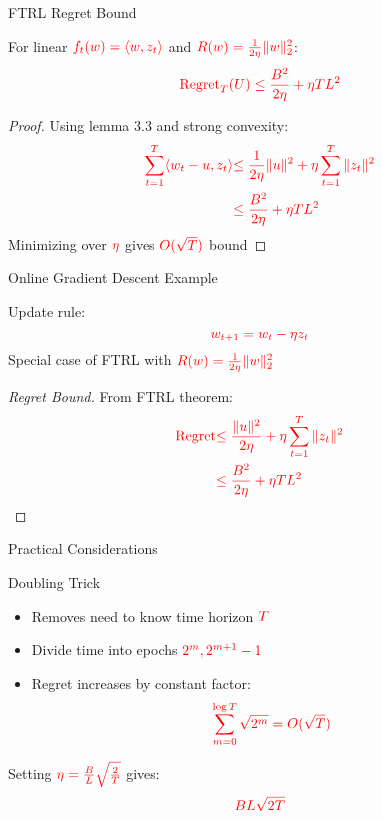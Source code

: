 \documentclass{beamer}
\begin{document}
\begin{frame}{FTRL Regret Bound}
\begin{theorem}[Theorem 2.4]
For linear $\textcolor{red}{f_t(w) = \langle w,z_t\rangle}$ and $\textcolor{red}{R(w) = \frac{1}{2\eta}\|w\|_2^2}$:
\[
\textcolor{red}{\text{Regret}_T(U) \leq \frac{B^2}{2\eta} + \eta T L^2}
\]
\end{theorem}

\begin{proof}
Using lemma 3.3 and strong convexity:
\begin{align*}
\textcolor{red}{\sum_{t=1}^T \langle w_t - u, z_t \rangle} &\textcolor{red}{\leq \frac{1}{2\eta}\|u\|^2 + \eta \sum_{t=1}^T \|z_t\|^2} \\
&\textcolor{red}{\leq \frac{B^2}{2\eta} + \eta T L^2}
\end{align*}
Minimizing over $\textcolor{red}{\eta}$ gives $\textcolor{red}{O(\sqrt{T})}$ bound
\end{proof}
\end{frame}

\begin{frame}{Online Gradient Descent Example}
\begin{example}
Update rule:
\[
\textcolor{red}{w_{t+1} = w_t - \eta z_t}
\]
Special case of FTRL with $\textcolor{red}{R(w) = \frac{1}{2\eta}\|w\|_2^2}$
\end{example}

\begin{proof}[Regret Bound]
From FTRL theorem:
\begin{align*}
\textcolor{red}{\text{Regret}} &\textcolor{red}{\leq \frac{\|u\|^2}{2\eta} + \eta \sum_{t=1}^T \|z_t\|^2} \\
&\textcolor{red}{\leq \frac{B^2}{2\eta} + \eta T L^2}
\end{align*}
\end{proof}
\end{frame}

\begin{frame}{Practical Considerations}
\begin{block}{Doubling Trick}
\begin{itemize}
\item Removes need to know time horizon $\textcolor{red}{T}$
\item Divide time into epochs $\textcolor{red}{2^m,2^{m+1}-1}$
\item Regret increases by constant factor:
\[
\textcolor{red}{\sum_{m=0}^{\log T} \sqrt{2^m} = O(\sqrt{T})}
\]
\end{itemize}
\end{block}

\begin{example}
Setting $\textcolor{red}{\eta = \frac{B}{L}\sqrt{\frac{2}{T}}}$ gives:
\[
\textcolor{red}{BL\sqrt{2T}}
\]
\end{example}
\end{frame}
\end{document}
